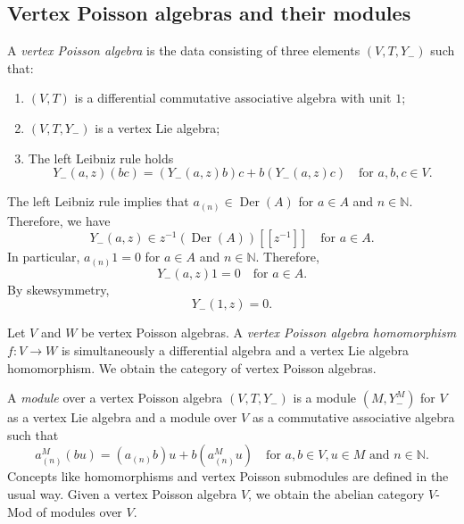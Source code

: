 \documentclass[a4paper, 12pt, reqno]{amsart}
\theoremstyle{remark}
\numberwithin{equation}{subsection}
\DeclareMathOperator{\Der}{Der}
\begin{document}
\subsection{Vertex Poisson algebras and their modules}
\label{sec:vert-poiss-algeb-2}

A \emph{vertex Poisson algebra} is the data consisting of three elements $(V, T, Y_-)$ such that:
\begin{enumerate}
\item $(V, T)$ is a differential commutative associative algebra with unit $1$;
\item $(V, T, Y_-)$ is a vertex Lie algebra;
\item The left Leibniz rule holds
  \begin{equation*}
    Y_-(a, z)(bc) = (Y_-(a, z)b)c + b(Y_-(a, z)c) \quad \text{for }a, b, c \in V.
  \end{equation*}
\end{enumerate}
The left Leibniz rule implies that $a_{(n)} \in \Der(A)$ for $a \in A$ and $n \in \mathbb{N}$.
Therefore, we have
\begin{equation*}
  Y_-(a, z) \in z^{-1}(\Der(A))[[z^{-1}]] \quad \text{for }a \in A.
\end{equation*}
In particular, $a_{(n)}1 = 0$ for $a \in A$ and $n \in \mathbb{N}$.
Therefore,
\begin{equation*}
  Y_-(a, z)1 = 0 \quad \text{for }a \in A.
\end{equation*}
By skewsymmetry,
\begin{equation*}
  Y_-(1, z) = 0.
\end{equation*}

Let $V$ and $W$ be vertex Poisson algebras.
A \emph{vertex Poisson algebra homomorphism} $f: V \to W$ is simultaneously a differential algebra and a vertex Lie algebra homomorphism.
We obtain the category of vertex Poisson algebras.

A \emph{module} over a vertex Poisson algebra $(V, T, Y_-)$ is a module $(M, Y^M_-)$ for $V$ as a vertex Lie algebra and a module over $V$ as a commutative associative algebra such that
\begin{equation*}
  a^M_{(n)}(bu) = (a_{(n)}b)u + b(a^M_{(n)}u) \quad \text{for }a, b \in V, u \in M\text{ and }n \in \mathbb{N}.
\end{equation*}
Concepts like homomorphisms and vertex Poisson submodules are defined in the usual way.
Given a vertex Poisson algebra $V$, we obtain the abelian category $V$-Mod of modules over $V$.
\end{document}
